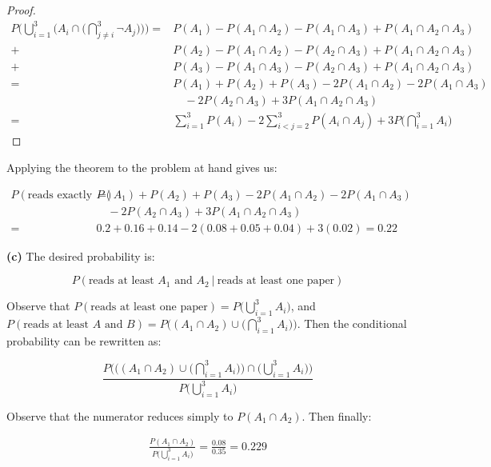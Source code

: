 \documentclass[10pt, oneside]{article}   	%
\theoremstyle{definition}
\begin{document}
\begin{enumerate}[label=3.\arabic*]
\begin{proof}
\begin{align*}
P \Bigg( \bigcup^3_{i=1} \bigg( A_i  \cap \Big( \bigcap^3_{j \neq i} \neg A_j \Big) \bigg) \Bigg) = &P(A_1) - P(A_1 \cap A_2) - P(A_1 \cap A_3) + P(A_1 \cap A_2 \cap A_3) \\
+&P(A_2) - P(A_1 \cap A_2) - P(A_2 \cap A_3) + P(A_1 \cap A_2 \cap A_3) \\
+&P(A_3) - P(A_1 \cap A_3) - P(A_2 \cap A_3) + P(A_1 \cap A_2 \cap A_3) \\
= &P(A_1) + P(A_2) + P(A_3) - 2P(A_1 \cap A_2) - 2P(A_1 \cap A_3) \\
&\quad - 2P(A_2 \cap A_3) + 3P(A_1 \cap A_2 \cap A_3) \\
= &\boxed{ \sum^3_{i = 1} P(A_i) - 2 \sum^3_{i < j = 2} P(A_i \cap A_j) + 3 P\Bigg( \bigcap^3_{i=1} A_i \Bigg) }
\end{align*} 

\end{proof}

Applying the theorem to the problem at hand gives us:

\begin{align*}
P(\text{reads exactly one paper}) = &P(A_1) + P(A_2) + P(A_3) - 2P(A_1 \cap A_2) - 2P(A_1 \cap A_3) \\
&\quad - 2P(A_2 \cap A_3) + 3P(A_1 \cap A_2 \cap A_3) \\
= &0.2+0.16+0.14-2\left(0.08+0.05+0.04\right)+3\left(0.02\right) = \boxed{0.22}
\end{align*}

\textbf{(c)} The desired probability is:

\[ P(\text{reads at least $A_1$ and $A_2$} \ | \ \text{reads at least one paper} ) \]

Observe that $P(\text{reads at least one paper}) = P \big( \bigcup^3_{i = 1} A_i \big)$, and $P(\text{reads at least $A$ and $B$}) = P\Big( (A_1 \cap A_2) \cup \Big( \bigcap^3_{i=1} A_i \Big) \Big)$. Then the conditional probability can be rewritten as:

\[ \frac{P\Big( \Big( (A_1 \cap A_2) \cup \Big( \bigcap^3_{i=1} A_i \Big) \Big) \cap \big( \bigcup^3_{i = 1} A_i \big) \Big)}{P \big( \bigcup^3_{i = 1} A_i \big)} \]

Observe that the numerator reduces simply to $P(A_1 \cap A_2)$. Then finally:

\begin{align*}
\frac{P(A_1 \cap A_2)}{P \big( \bigcup^3_{i = 1} A_i \big)} = \boxed{ \frac{0.08}{0.35} = 0.229}
\end{align*}


\end{enumerate}
\end{document}
